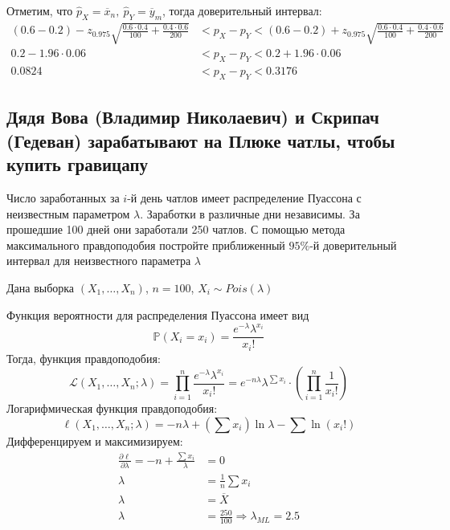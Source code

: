 \documentclass{article}
\begin{document}
Отметим, что $\widehat{p}_X=\overline{x}_n,\ \widehat{p}_Y=\overline{y}_m$, тогда доверительный интервал:
\begin{equation*}
    \begin{aligned}
        \left(0.6-0.2\right)- z_{0.975}\sqrt{\frac{0.6\cdot0.4}{100}+\frac{0.4\cdot0.6}{200}}&<p_X-p_Y<\left(0.6-0.2\right)+z_{0.975}\sqrt{\frac{0.6\cdot0.4}{100}+\frac{0.4\cdot0.6}{200}}\\
        0.2- 1.96\cdot0.06&<p_X-p_Y<0.2+1.96\cdot0.06\\
        0.0824&<p_X-p_Y<0.3176
    \end{aligned}
\end{equation*}

\subsection{Дядя Вова (Владимир Николаевич) и Скрипач (Гедеван) зарабатывают на Плюке чатлы, чтобы купить гравицапу}
Число заработанных за $i$-й день чатлов имеет распределение Пуассона с неизвестным параметром $\lambda$. Заработки в различные дни независимы. За прошедшие 100 дней они заработали 250 чатлов.
С помощью метода максимального правдоподобия постройте приближенный $95 \%$-й доверительный интервал для неизвестного параметра $\lambda$

Дана выборка $\left(X_1,\ldots,X_n\right)$, $n=100$, $X_i\sim Pois(\lambda)$

Функция вероятности для распределения Пуассона имеет вид
\begin{equation*}
    \mathbb{P}(X_i=x_i)=\frac{e^{-\lambda}\lambda^{x_i}}{x_i!}
\end{equation*}
Тогда, функция правдоподобия:
\begin{equation*}
    \mathcal{L}(X_1,\ldots,X_n;\lambda)=\prod_{i=1}^{n}\frac{e^{-\lambda}\lambda^{x_i}}{x_i!}=e^{-n\lambda} \lambda^{\sum x_i} \cdot \left( \prod_{i=1}^{n} \frac{1}{x_i!} \right)
\end{equation*}
Логарифмическая функция правдоподобия:
\begin{equation*}
    \ell(X_1,\ldots,X_n;\lambda) = -n\lambda + \left( \sum x_i \right) \ln \lambda - \sum \ln(x_i!)
\end{equation*}
Дифференцируем и максимизируем:
\begin{equation*}
    \begin{aligned}
        \frac{\partial\ell}{\partial\lambda} = -n + \frac{\sum x_i}{\lambda}&=0\\
        \lambda&=\frac{1}{n}\sum x_i\\
        \lambda&=\overline{X}\\
        \lambda&=\frac{250}{100}\Longrightarrow\lambda_{ML}=2.5
    \end{aligned}
\end{equation*}
\end{document}
